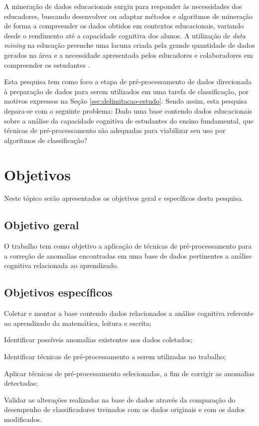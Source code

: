 A mineração de dados educacionais surgiu para responder às necessidades dos educadores, buscando desenvolver ou adaptar métodos e algoritmos de mineração de forma a compreender os dados obtidos em contextos educacionais, variando desde o rendimento até a capacidade cognitiva dos alunos. A utilização de \textit{data mining} na educação preenche uma lacuna criada pela grande quantidade de dados gerados na área e a necessidade apresentada pelos educadores e colaboradores em compreender os estudantes \cite{costa2013mineraccao}.

Esta pesquisa tem como foco a etapa de pré\hyp{}processamento de dados direcionada à preparação de dados para serem utilizados em uma tarefa de classificação, por motivos expressos na Seção \ref{sec:delimitacao-estudo}. Sendo assim, esta pesquisa depara\hyp{}se com o seguinte problema: Dado uma base contendo dados educacionais sobre a análise da capacidade cognitiva de estudantes do ensino fundamental, que técnicas de pré\hyp{}processamento são adequadas para viabilizar seu uso por algoritmos de classificação?

\section{Objetivos}
\label{sec:objetivos}

Neste tópico serão apresentados os objetivos geral e específicos desta pesquisa.

\subsection{Objetivo geral}
\label{subsec:objetivo-geral}

O trabalho tem como objetivo a aplicação de técnicas de pré\hyp{}processamento para a correção de anomalias encontradas em uma base de dados pertinentes a análise cognitiva relacionada ao aprendizado.

\subsection{Objetivos específicos}
\label{subsec:objetivos-especificos}

\begin{alineas}
    \item Coletar e montar a base contendo dados relacionados a análise cognitiva referente ao aprendizado da matemática, leitura e escrita;
    \item Identificar possíveis anomalias existentes nos dados coletados;
    \item Identificar técnicas de pré\hyp{}processamento a serem utilizadas no trabalho;
    \item Aplicar técnicas de pré\hyp{}processamento selecionadas, a fim de corrigir as anomalias detectadas;
    \item Validar as alterações realizadas na base de dados através da comparação do desempenho de classificadores treinados com os dados originais e com os dados modificados.
\end{alineas}

